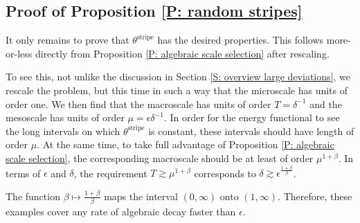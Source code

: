 \documentclass[10pt,a4paper]{amsart}
\begin{document}
\subsection{Proof of Proposition \ref{P: random stripes}} It only remains to prove that $\theta^{\text{stripe}}$ has the desired properties.  This follows more-or-less directly from Proposition \ref{P: algebraic scale selection} after rescaling.

To see this, not unlike the discussion in Section \ref{S: overview large deviations}, we rescale the problem, but this time in such a way that the microscale has units of order one.  We then find that the macroscale has units of order $T = \delta^{-1}$ and the mesoscale has units of order $\mu = \epsilon \delta^{-1}$.  In order for the energy functional to see the long intervals on which $\theta^{\text{stripe}}$ is constant, these intervals should have length of order $\mu$.  At the same time, to take full advantage of Proposition \ref{P: algebraic scale selection}, the corresponding macroscale should be at least of order $\mu^{1 + \beta}$.  In terms of $\epsilon$ and $\delta$, the requirement $T \gtrsim \mu^{1 + \beta}$ corresponds to $\delta \gtrsim \epsilon^{\frac{1 + \beta}{\beta}}$.

The function $\beta \mapsto \frac{1 + \beta}{\beta}$ maps the interval $(0,\infty)$ onto $(1,\infty)$.  Therefore, these examples cover any rate of algebraic decay faster than $\epsilon$.
\end{document}
